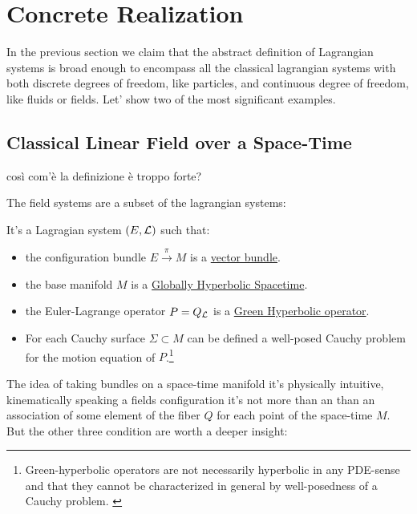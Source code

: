 \documentclass[Main]{subfiles}
\begin{document}
	
	\section{Concrete Realization}
	In the previous section we claim that the abstract definition of Lagrangian systems is broad enough to encompass all the classical lagrangian systems with both discrete degrees of freedom, like particles, and continuous degree of freedom, like fluids or fields.
	Let' show two of the most significant examples.
	
	
	
		\subsection{Classical Linear Field over a Space-Time}
		\danger così com'è la definizione è troppo forte?	
		
		
			The field systems are a subset of the lagrangian systems:
			\begin{definition}
				It's a Lagragian system $(E,\mathcal{L})$ such that:
				\begin{itemize}
					\item the configuration bundle $E\xrightarrow{\pi} M$ is a \underline{vector bundle}.
					\item the base manifold $M$ is a \underline{Globally Hyperbolic Spacetime}.
					\item the Euler-Lagrange operator $P= Q_{\mathcal{L}}$ is a \underline{Green Hyperbolic operator}.
					\item For each Cauchy surface $\Sigma \subset M$ can be defined a well-posed Cauchy problem for the motion equation of $P$.\footnote{Green-hyperbolic operators are not necessarily hyperbolic in any PDE-sense and that they cannot be characterized in general by well-posedness of a Cauchy problem. \cite{Terlaky2010} \cite{Bar2010}}
				\end{itemize}
			\end{definition}
		The idea of taking bundles on a space-time manifold it's physically intuitive, kinematically speaking a fields configuration it's not more than an than an association of some element of the fiber $Q $ for each point of the space-time $M$.
		But the other three condition are worth a deeper insight:
\end{document}
